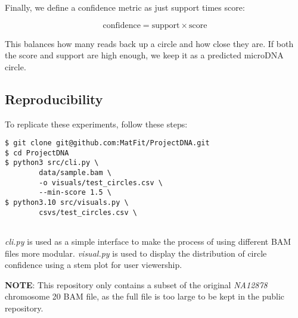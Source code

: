 \documentclass[11pt, letterpaper]{article}
\begin{document}
Finally, we define a confidence metric as just support times score:

\[
\text{confidence} = \text{support} \times \text{score}
\]

This balances how many reads back up a circle and how close they are. If both the score and support are high enough, we keep it as a predicted microDNA circle.


\subsection{Reproducibility}
To replicate these experiments, follow these steps:

\begin{verbatim}
$ git clone git@github.com:MatFit/ProjectDNA.git
$ cd ProjectDNA
$ python3 src/cli.py \
        data/sample.bam \
        -o visuals/test_circles.csv \
        --min-score 1.5 \ 
$ python3.10 src/visuals.py \
        csvs/test_circles.csv \


\end{verbatim}
\textit{cli.py} is used as a simple interface to make the process of using different BAM files more modular. \textit{visual.py} is used to display the distribution of circle confidence using a stem plot for user viewership.

\vspace{\baselineskip}


\textbf{NOTE}: This repository only contains a subset of the original \textit{NA12878} chromosome 20 BAM file, as the full file is too large to be kept in the public repository.
\end{document}
